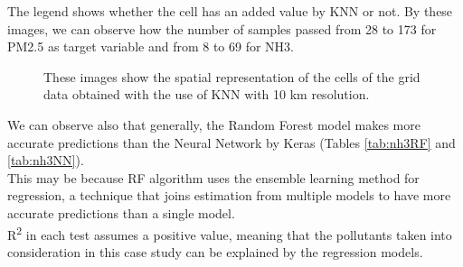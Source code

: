 The legend shows whether the cell has an added value by KNN or not. By these images, we can observe how the number of samples passed from 28 to 173 for PM2.5 as target variable and from 8 to 69 for NH3.
\begin{figure}[H] 
    \centering
    \hfill%
    \caption{These images show the spatial representation of the cells of the grid data obtained with the use of KNN with 10 km resolution.}
    \label{fig:comparison-sensors}
\end{figure}
We can observe also that generally, the Random Forest model makes more accurate predictions than the Neural Network by Keras (Tables \ref{tab:nh3RF} and \ref{tab:nh3NN}). \\
This may be because RF algorithm uses the ensemble learning method for regression, a technique that joins estimation from multiple models to have more accurate predictions than a single model.\\ 
R\textsuperscript{2} in each test assumes a positive value, meaning that the pollutants taken into consideration in this case study can be explained by the regression models. 
\pagebreak

